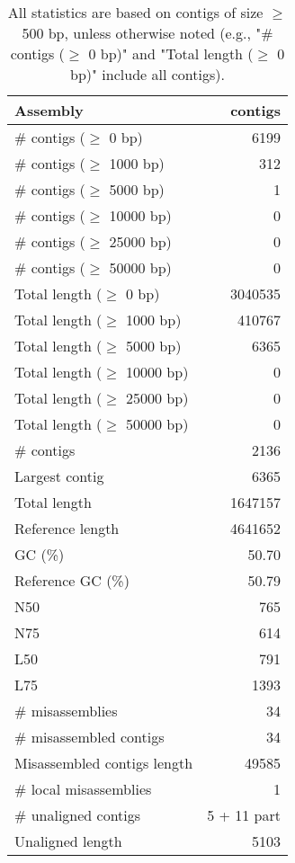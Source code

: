 \documentclass[12pt,a4paper]{article}
\begin{document}
\begin{table}[ht]
\begin{center}
\caption{All statistics are based on contigs of size $\geq$ 500 bp, unless otherwise noted (e.g., "\# contigs ($\geq$ 0 bp)" and "Total length ($\geq$ 0 bp)" include all contigs).}
\begin{tabular}{|l*{1}{|r}|}
\hline
Assembly & contigs \\ \hline
\# contigs ($\geq$ 0 bp) & 6199 \\ \hline
\# contigs ($\geq$ 1000 bp) & 312 \\ \hline
\# contigs ($\geq$ 5000 bp) & 1 \\ \hline
\# contigs ($\geq$ 10000 bp) & 0 \\ \hline
\# contigs ($\geq$ 25000 bp) & 0 \\ \hline
\# contigs ($\geq$ 50000 bp) & 0 \\ \hline
Total length ($\geq$ 0 bp) & 3040535 \\ \hline
Total length ($\geq$ 1000 bp) & 410767 \\ \hline
Total length ($\geq$ 5000 bp) & 6365 \\ \hline
Total length ($\geq$ 10000 bp) & 0 \\ \hline
Total length ($\geq$ 25000 bp) & 0 \\ \hline
Total length ($\geq$ 50000 bp) & 0 \\ \hline
\# contigs & 2136 \\ \hline
Largest contig & 6365 \\ \hline
Total length & 1647157 \\ \hline
Reference length & 4641652 \\ \hline
GC (\%) & 50.70 \\ \hline
Reference GC (\%) & 50.79 \\ \hline
N50 & 765 \\ \hline
N75 & 614 \\ \hline
L50 & 791 \\ \hline
L75 & 1393 \\ \hline
\# misassemblies & 34 \\ \hline
\# misassembled contigs & 34 \\ \hline
Misassembled contigs length & 49585 \\ \hline
\# local misassemblies & 1 \\ \hline
\# unaligned contigs & 5 + 11 part \\ \hline
Unaligned length & 5103 \\ \hline

\end{tabular}
\end{center}
\end{table}
\end{document}
